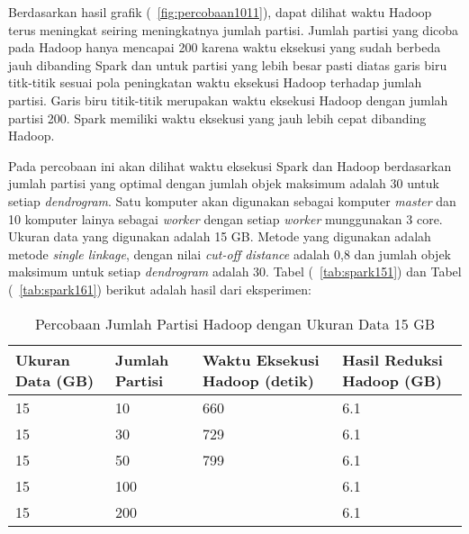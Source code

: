 Berdasarkan hasil grafik (~\ref{fig:percobaan1011}), dapat dilihat waktu Hadoop terus meningkat seiring meningkatnya jumlah partisi. Jumlah partisi yang dicoba pada Hadoop hanya mencapai 200 karena waktu eksekusi yang sudah berbeda jauh dibanding Spark dan untuk partisi yang lebih besar pasti diatas garis biru titk-titik sesuai pola peningkatan waktu eksekusi Hadoop terhadap jumlah partisi. Garis biru titik-titik merupakan waktu eksekusi Hadoop dengan jumlah partisi 200. Spark memiliki waktu eksekusi yang jauh lebih cepat dibanding Hadoop.  





Pada percobaan ini akan dilihat waktu eksekusi Spark dan Hadoop berdasarkan jumlah partisi yang optimal dengan jumlah objek maksimum adalah 30 untuk setiap \textit{dendrogram}. Satu komputer akan digunakan sebagai komputer \textit{master} dan 10 komputer lainya sebagai \textit{worker} dengan setiap \textit{worker} munggunakan 3 core. Ukuran data yang digunakan adalah 15 GB. Metode yang digunakan adalah metode \textit{single linkage}, dengan nilai \textit{cut-off distance} adalah 0,8 dan jumlah objek maksimum untuk setiap \textit{dendrogram} adalah 30. Tabel (~\ref{tab:spark151}) dan Tabel (~\ref{tab:spark161}) berikut adalah hasil dari eksperimen:





\begin{table}[H] 
	\centering 
	\caption{Percobaan Jumlah Partisi Hadoop dengan Ukuran Data 15 GB}
	\label{tab:spark1511}
	\begin{tabular}{|p{3cm}|p{3cm}|p{4cm}|p{4cm}|}
\hline
Ukuran Data (GB) & Jumlah Partisi &  Waktu Eksekusi Hadoop (detik) & Hasil Reduksi Hadoop (GB)\\
\hline
15 & 10 & 660  & 6.1  \\
\hline
15 & 30 & 729  & 6.1  \\
\hline
15 & 50 & 799  & 6.1  \\
\hline
15 & 100 &   & 6.1  \\
\hline
15 & 200 &   & 6.1  \\
\hline


\hline

	\end{tabular} 
\end{table}




